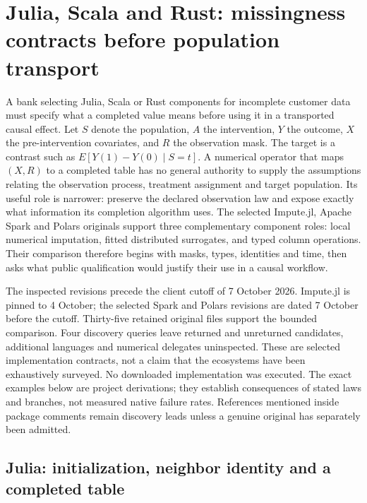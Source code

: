 \section[Remaining-language transport and missingness contracts]{Julia, Scala and Rust: missingness contracts before population transport}
\label{sec:exec25-otm}

A bank selecting Julia, Scala or Rust components for incomplete customer data must specify what a completed value means before using it in a transported causal effect. Let $S$ denote the population, $A$ the intervention, $Y$ the outcome, $X$ the pre-intervention covariates, and $R$ the observation mask. The target is a contrast such as $E[Y(1)-Y(0)\mid S=t]$. A numerical operator that maps $(X,R)$ to a completed table has no general authority to supply the assumptions relating the observation process, treatment assignment and target population. Its useful role is narrower: preserve the declared observation law and expose exactly what information its completion algorithm uses. The selected Impute.jl, Apache Spark and Polars originals support three complementary component roles: local numerical imputation, fitted distributed surrogates, and typed column operations. Their comparison therefore begins with masks, types, identities and time, then asks what public qualification would justify their use in a causal workflow.\citep{exec25_otm_imputejl,exec25_otm_spark,exec25_otm_polars,exec25_otm_choice}

The inspected revisions precede the client cutoff of 7 October 2026. Impute.jl is pinned to 4 October; the selected Spark and Polars revisions are dated 7 October before the cutoff. Thirty-five retained original files support the bounded comparison. Four discovery queries leave returned and unreturned candidates, additional languages and numerical delegates uninspected. These are selected implementation contracts, not a claim that the ecosystems have been exhaustively surveyed. No downloaded implementation was executed. The exact examples below are project derivations; they establish consequences of stated laws and branches, not measured native failure rates. References mentioned inside package comments remain discovery leads unless a genuine original has separately been admitted.\citep{exec25_otm_choice}

\subsection{Julia: initialization, neighbor identity and a completed table}

